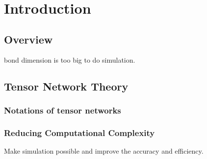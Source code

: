 \chapter{Introduction}
\label{chapter:Introduction}

\section{Overview}
\label{overview}
	bond dimension is too big to do simulation.

\section{Tensor Network Theory}
\subsection{Notations of tensor networks} %
\label{sub:notations}

\subsection{Reducing Computational Complexity} %
\label{sub:reduce}
Make simulation possible and improve the accuracy and efficiency.

